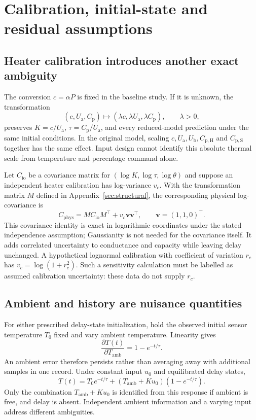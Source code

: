 \documentclass[11pt]{article}
\newcommand{\Ua}{U_{\mathrm a}}
\newcommand{\Ub}{U_{\mathrm b}}
\newcommand{\Cp}{C_{\mathrm p}}
\newcommand{\CpH}{C_{\mathrm{p,H}}}
\newcommand{\CpS}{C_{\mathrm{p,S}}}
\newcommand{\Tamb}{T_{\mathrm{amb}}}
\begin{document}


\section{Calibration, initial-state and residual assumptions}
\label{sec:nuisance-assumptions}

\subsection{Heater calibration introduces another exact ambiguity}
The conversion $c=\alpha P$ is fixed in the baseline study. If it is unknown,
the transformation
\[
 (c,\Ua,\Cp)\longmapsto(\lambda c,\lambda\Ua,\lambda\Cp),
 \qquad \lambda>0,
\]
preserves $K=c/\Ua$, $\tau=\Cp/\Ua$, and every reduced-model prediction under
the same initial conditions. In the original model, scaling $c,\Ua,\Ub,\CpH$
and $\CpS$ together has the same effect. Input design cannot identify this
absolute thermal scale from temperature and percentage command alone.

Let $C_{\mathrm{io}}$ be a covariance matrix for
$(\log K,\log\tau,\log\theta)$ and suppose an independent heater calibration
has log-variance $v_c$. With the transformation matrix $M$ defined in
Appendix~\ref{sec:structural}, the corresponding physical log-covariance is
\[
 C_{\mathrm{phys}}=M C_{\mathrm{io}}M^\top+v_c\bm v\bm v^\top,
 \qquad \bm v=(1,1,0)^\top.
\]
This covariance identity is exact in logarithmic coordinates under the stated
independence assumption; Gaussianity is not needed for the covariance itself.
It adds correlated uncertainty to conductance and capacity while leaving delay
unchanged. A hypothetical lognormal calibration with coefficient of variation
$r_c$ has $v_c=\log(1+r_c^2)$. Such a sensitivity calculation must be labelled
as assumed calibration uncertainty: these data do not supply $r_c$.

\subsection{Ambient and history are nuisance quantities}
For either prescribed delay-state initialization, hold the observed initial
sensor temperature $T_0$ fixed and vary ambient temperature. Linearity gives
\[
 \frac{\partial T(t)}{\partial\Tamb}=1-e^{-t/\tau}.
\]
An ambient error therefore persists rather than averaging away with additional
samples in one record. Under constant input $u_0$ and equilibrated delay states,
\[
 T(t)=T_0 e^{-t/\tau}+(\Tamb+Ku_0)(1-e^{-t/\tau}).
\]
Only the combination $\Tamb+Ku_0$ is identified from this response if ambient
is free, and delay is absent. Independent ambient information and a varying
input address different ambiguities.
\end{document}
